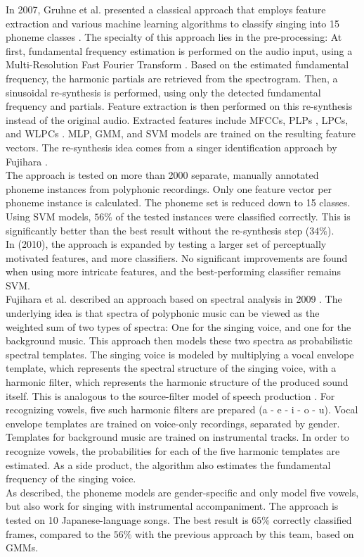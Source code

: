 In 2007, Gruhne et al. presented a classical approach that employs feature extraction and various machine learning algorithms to classify singing into 15 phoneme classes \cite{Gruhne2007} \cite{Gruhne2007a}. The specialty of this approach lies in the pre-processing: At first, fundamental frequency estimation is performed on the audio input, using a Multi-Resolution Fast Fourier Transform \cite{inproceedings:dressler}. Based on the estimated fundamental frequency, the harmonic partials are retrieved from the spectrogram. Then, a sinusoidal re-synthesis is performed, using only the detected fundamental frequency and partials. Feature extraction is then performed on this re-synthesis instead of the original audio. Extracted features include MFCCs, PLPs \cite{plp2}, LPCs, and WLPCs \cite{lpc}. MLP, GMM, and SVM models are trained on the resulting feature vectors. The re-synthesis idea comes from a singer identification approach by Fujihara \cite{fujihara_identification}.\\
The approach is tested on more than 2000 separate, manually annotated phoneme instances from polyphonic recordings. Only one feature vector per phoneme instance is calculated. The phoneme set is reduced down to 15 classes. Using SVM models, $56\%$ of the tested instances were classified correctly. This is significantly better than the best result without the re-synthesis step ($34\%$).\\
In \cite{szepannek} (2010), the approach is expanded by testing a larger set of perceptually motivated features, and more classifiers. No significant improvements are found when using more intricate features, and the best-performing classifier remains SVM.\\

Fujihara et al. described an approach based on spectral analysis in 2009 \cite{fujihara_phonemes}. The underlying idea is that spectra of polyphonic music can be viewed as the weighted sum of two types of spectra: One for the singing voice, and one for the background music. This approach then models these two spectra as probabilistic spectral templates. The singing voice is modeled by multiplying a vocal envelope template, which represents the spectral structure of the singing voice, with a harmonic filter, which represents the harmonic structure of the produced sound itself. This is analogous to the source-filter model of speech production \cite{Fant1981}. For recognizing vowels, five such harmonic filters are prepared (a - e - i - o - u). Vocal envelope templates are trained on voice-only recordings, separated by gender. Templates for background music are trained on instrumental tracks. In order to recognize vowels, the probabilities for each of the five harmonic templates are estimated. As a side product, the algorithm also estimates the fundamental frequency of the singing voice.\\
As described, the phoneme models are gender-specific and only model five vowels, but also work for singing with instrumental accompaniment. The approach is tested on 10 Japanese-language songs. The best result is $65\%$ correctly classified frames, compared to the $56\%$ with the previous approach by this team, based on GMMs. \\

